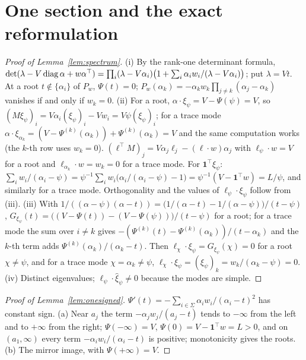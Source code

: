 \documentclass[11pt,a4paper]{report}
\newcommand{\one}{\mathbf 1}
\begin{document}
\section{One section and the exact reformulation}\label{app:section}

\begin{proof}[Proof of Lemma~\ref{lem:spectrum}]
(i) By the rank-one determinant formula, \(\det(\lambda-V\operatorname{diag}\alpha+w\alpha^\top)=\prod_i(\lambda-V\alpha_i)\bigl(1+\sum_i\alpha_iw_i/(\lambda-V\alpha_i)\bigr)\);
put \(\lambda=Vt\). At a root \(t\notin\{\alpha_i\}\) of \(P_w\), \(\Psi(t)=0\); \(P_w(\alpha_k)=-\alpha_kw_k\prod_{j\ne k}(\alpha_j-\alpha_k)\) vanishes if and only if
\(w_k=0\). (ii) For a root, \(\alpha\cdot\xi_\psi=V-\Psi(\psi)=V\), so \((M\xi_\psi)_i=V\alpha_i(\xi_\psi)_i-Vw_i=V\psi(\xi_\psi)_i\); for a trace mode
\(\alpha\cdot\xi_{\alpha_k}=(V-\Psi^{(k)}(\alpha_k))+\Psi^{(k)}(\alpha_k)=V\) and the same computation works (the \(k\)-th row uses \(w_k=0\)).
\((\ell^\top M)_j=V\alpha_j\ell_j-(\ell\cdot w)\alpha_j\) with \(\ell_\psi\cdot w=V\) for a root and \(\ell_{\alpha_k}\cdot w=w_k=0\) for a trace mode. For
\(\one^\top\xi_\psi\): \(\sum_iw_i/(\alpha_i-\psi)=\psi^{-1}\sum_iw_i\bigl(\alpha_i/(\alpha_i-\psi)-1\bigr)=\psi^{-1}(V-\one^\top w)=L/\psi\), and similarly
for a trace mode. Orthogonality and the values of \(\ell_\psi\cdot\xi_\psi\) follow from (iii). (iii) With
\(1/((\alpha-\psi)(\alpha-t))=\bigl(1/(\alpha-t)-1/(\alpha-\psi)\bigr)/(t-\psi)\), \(G_{\xi_\psi}(t)=\bigl((V-\Psi(t))-(V-\Psi(\psi))\bigr)/(t-\psi)\) for a
root; for a trace mode the sum over \(i\ne k\) gives \(-(\Psi^{(k)}(t)-\Psi^{(k)}(\alpha_k))/(t-\alpha_k)\) and the \(k\)-th term adds
\(\Psi^{(k)}(\alpha_k)/(\alpha_k-t)\). Then \(\ell_\chi\cdot\xi_\psi=G_{\xi_\psi}(\chi)=0\) for a root \(\chi\ne\psi\), and for a trace mode
\(\chi=\alpha_k\ne\psi\), \(\ell_\chi\cdot\xi_\psi=(\xi_\psi)_k=w_k/(\alpha_k-\psi)=0\). (iv) Distinct eigenvalues; \(\ell_\psi\cdot\hat\xi_\psi\ne0\) because
the modes are simple.
\end{proof}

\begin{proof}[Proof of Lemma~\ref{lem:onesigned}]
\(\Psi'(t)=-\sum_{i\in\Sigma}\alpha_iw_i/(\alpha_i-t)^2\) has constant sign. (a) Near \(a_j\) the term \(-\alpha_jw_j/(a_j-t)\) tends to \(-\infty\)
from the left and to \(+\infty\) from the right; \(\Psi(-\infty)=V\), \(\Psi(0)=V-\one^\top w=L>0\), and on \((a_1,\infty)\) every term
\(-\alpha_iw_i/(\alpha_i-t)\) is positive; monotonicity gives the roots. (b) The mirror image, with \(\Psi(+\infty)=V\).
\end{proof}
\end{document}
